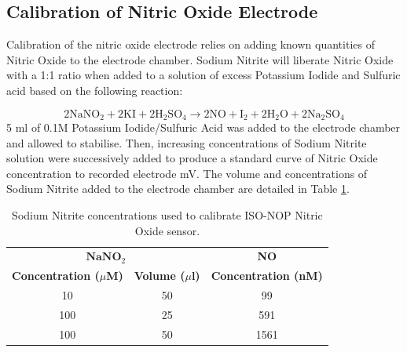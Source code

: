 \subsection{Calibration of Nitric Oxide Electrode}
Calibration of the nitric oxide electrode relies on adding known quantities of Nitric Oxide to the electrode chamber. Sodium Nitrite will liberate Nitric Oxide with a 1:1 ratio when added to a solution of excess Potassium Iodide and Sulfuric acid based on the following reaction:

\begin{equation}
2\mathrm{NaNO}_2 + 2\mathrm{KI} + 2 \mathrm{H}_2\mathrm{SO}_4 \longrightarrow 2\mathrm{NO} + \mathrm{I}_2 + 2\mathrm{H}_2\mathrm{O} + 2\mathrm{Na}_2\mathrm{SO}_4
\end{equation}
5 ml of 0.1M Potassium Iodide/Sulfuric Acid was added to the electrode chamber and allowed to stabilise. Then, increasing concentrations of Sodium Nitrite solution were successively added to produce a standard curve of Nitric Oxide concentration to recorded electrode mV. The volume and concentrations of Sodium Nitrite added to the electrode chamber are detailed in Table \ref{tab:sodiumnitrite}.

\begin{table}[tbp]
\begin{center}
\begin{tabular}{ccc}
\toprule
\multicolumn{2}{c}{$\mathbf{NaNO}_2$} & \textbf{NO} \\
\textbf{Concentration ($\mu$M)} & \textbf{Volume ($\mu$l)} & \textbf{Concentration (nM)} \\
\midrule
10 & 50 & 99 \\
100 & 25 & 591 \\
100 & 50 & 1561 \\
\bottomrule
\end{tabular} 
\end{center}
\caption{Sodium Nitrite concentrations used to calibrate ISO-NOP Nitric Oxide sensor.
\label{tab:sodiumnitrite}}
\end{table}

